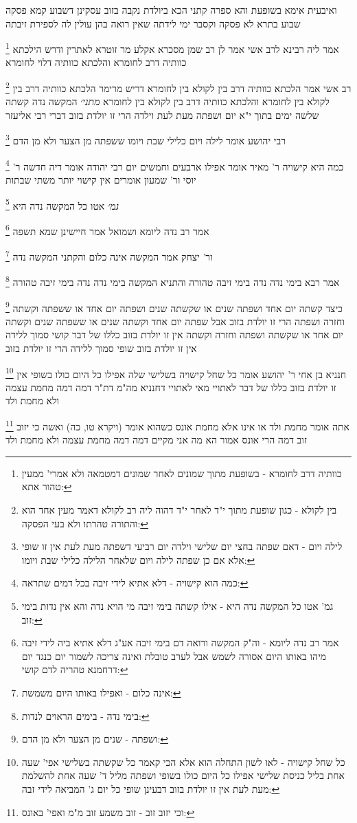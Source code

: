 \documentclass[12pt, openany]{book}
\newcommand{\footnotecomment}[1]{
	\renewcommand\thefootnote{}
	\footnote{#1}}
\newcommand{\commenta}[1]{\footnotecomment{#1}}
\begin{document}
{ואיבעית אימא בשופעת והא ספרה קתני 
הכא ביולדת נקבה בזוב עסקינן דשבוע קמא פסקה שבוע בתרא לא פסקה וקסבר ימי לידתה שאין רואה בהן עולין לה לספירת זיבתה 
\commenta{כוותיה דרב לחומרא - בשופעת מתוך שמונים לאחר שמונים דמטמאה ולא אמרי' ממעין טהור אתא:}
אמר ליה רבינא לרב אשי אמר לן רב שמן מסכרא אקלע מר זוטרא לאתרין ודרש הילכתא כוותיה דרב לחומרא והלכתא כוותיה דלוי לחומרא 
\commenta{בין לקולא - כגון שופעת מתוך י"ד לאחר י"ד דהוה ליה רב לקולא דאמר מעין אחד הוא והתורה טהרתו ולא בעי הפסקה:}
רב אשי אמר הלכתא כוותיה דרב בין לקולא בין לחומרא דריש מרימר הלכתא כוותיה דרב בין לקולא בין לחומרא והלכתא כוותיה דרב בין לקולא בין לחומרא
{\large\emph{מתני׳}} המקשה נדה קשתה שלשה ימים בתוך י"א יום ושפתה מעת לעת וילדה הרי זו יולדת בזוב דברי רבי אליעזר 
\commenta{לילה ויום - דאם שפתה בחצי יום שלישי וילדה יום רביעי דשפתה מעת לעת אין זו שופי אלא אם כן שפתה לילה ויום שלאחר הלילה כלילי שבת ויומו:}
רבי יהושע אומר לילה ויום כלילי שבת ויומו ששפתה מן הצער ולא מן הדם 
\commenta{כמה הוא קישויה - דלא אתיא לידי זיבה בכל דמים שתראה:}
כמה היא קישויה ר' מאיר אומר אפילו ארבעים וחמשים יום רבי יהודה אומר דיה חדשה ר' יוסי ור' שמעון אומרים אין קישוי יותר משתי שבתות
\commenta{גמ' אטו כל המקשה נדה היא - אילו קשתה בימי זיבה מי הויא נדה והא אין נדות בימי זוב:}
{\large\emph{גמ׳}} אטו כל המקשה נדה היא
\commenta{אמר רב נדה ליומא - וה"ק המקשה ורואה דם בימי זיבה אע"ג דלא אתיא ביה לידי זיבה מיהו באותו היום אסורה לשמש אבל לערב טובלת ואינה צריכה לשמור יום כנגד יום דרחמנא טהריה לדם קושי:}
אמר רב נדה ליומא ושמואל אמר חיישינן שמא תשפה 
\commenta{אינה כלום - ואפילו באותו היום משמשת:}
ור' יצחק אמר המקשה אינה כלום והקתני המקשה נדה 
\commenta{בימי נדה - בימים הראוים לנדות:}
אמר רבא בימי נדה נדה בימי זיבה טהורה והתניא המקשה בימי נדה נדה בימי זיבה טהורה 
\commenta{ושפתה - שנים מן הצער ולא מן הדם:}
כיצד קשתה יום אחד ושפתה שנים או שקשתה שנים ושפתה יום אחד או ששפתה וקשתה וחזרה ושפתה הרי זו יולדת בזוב 
אבל שפתה יום אחד וקשתה שנים או ששפתה שנים וקשתה יום אחד או שקשתה ושפתה וחזרה וקשתה אין זו יולדת בזוב כללו של דבר קושי סמוך ללידה אין זו יולדת בזוב שופי סמוך ללידה הרי זו יולדת בזוב 
\commenta{כל שחל קישויה - לאו לשון התחלה הוא אלא הכי קאמר כל שקשתה בשלישי אפי' שעה אחת בליל כניסת שלישי אפילו כל היום כולו בשופי ושפתה מליל ד' שעה אחת להשלמת מעת לעת אין זו יולדת בזוב דבעינן שופי כל יום ג' המביאה לידי זבה:}
חנניא בן אחי ר' יהושע אומר כל שחל קישויה בשלישי שלה אפילו כל היום כולו בשופי אין זו יולדת בזוב 
כללו של דבר לאתויי מאי לאתויי דחנניא 
מה"מ דת"ר דמה דמה מחמת עצמה ולא מחמת ולד 
\commenta{וכי יזוב זוב - זוב משמע זוב מ"מ ואפי' באונס:}
אתה אומר מחמת ולד או אינו אלא מחמת אונס כשהוא אומר (ויקרא טו, כה) ואשה כי יזוב זוב דמה הרי אונס אמור הא מה אני מקיים דמה דמה מחמת עצמה ולא מחמת ולד 
}
\end{document}

